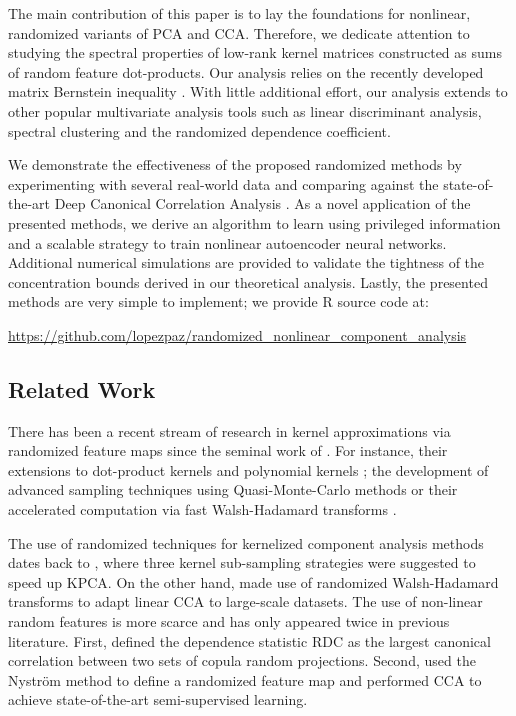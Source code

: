 \documentclass{article}
\begin{document}
  The main contribution of this paper is to lay the foundations for nonlinear,
  randomized variants of PCA and CCA. Therefore, we dedicate attention to
  studying the spectral properties of low-rank kernel matrices constructed as
  sums of random feature dot-products.  Our analysis relies on the recently
  developed matrix Bernstein inequality \citep{Tropp14}. With little additional
  effort, our analysis extends to other popular multivariate analysis tools
  such as linear discriminant analysis, spectral clustering and the randomized
  dependence coefficient.

  We demonstrate the effectiveness of the proposed randomized methods by
  experimenting with several real-world data and comparing against the
  state-of-the-art Deep Canonical Correlation Analysis \citep{Galen13}.
  As a novel application of the presented methods, we derive an algorithm to
  learn using privileged information \citep{Vapnik09} and a scalable strategy
  to train nonlinear autoencoder neural networks.  Additional numerical
  simulations are provided to validate the tightness of the concentration
  bounds derived in our theoretical analysis. Lastly, the presented methods are
  very simple to implement; we provide R source code at:
  \vspace*{ -0.1cm}
  \begin{center}
    {\small\url{https://github.com/lopezpaz/randomized_nonlinear_component_analysis}}
  \end{center}

  \subsection{Related Work}
  There has been a recent stream of research in kernel approximations via
  randomized feature maps since the seminal work of \citet{Rahimi08}. For
  instance, their extensions to dot-product kernels \citep{kar2012random} and
  polynomial kernels \citep{hamid2013compact}; the development of advanced
  sampling techniques using Quasi-Monte-Carlo methods \citep{yang14} or their
  accelerated computation via fast Walsh-Hadamard transforms \citep{Le13}.

  The use of randomized techniques for kernelized component analysis methods
  dates back to \citep{achlio02}, where three kernel sub-sampling strategies
  were suggested to speed up KPCA.  On the other hand, \citep{Avron13} made use
  of randomized Walsh-Hadamard transforms to adapt linear CCA to large-scale
  datasets. The use of non-linear random features is more scarce and has only
  appeared twice in previous literature. First, \citet{Lopez-Paz13} defined the
  dependence statistic RDC as the largest canonical correlation between two
  sets of copula random projections.  Second, \citet{McWilliams13} used the
  Nystr\"om method to define a randomized feature map and performed CCA to
  achieve state-of-the-art semi-supervised learning.
  
\end{document}
